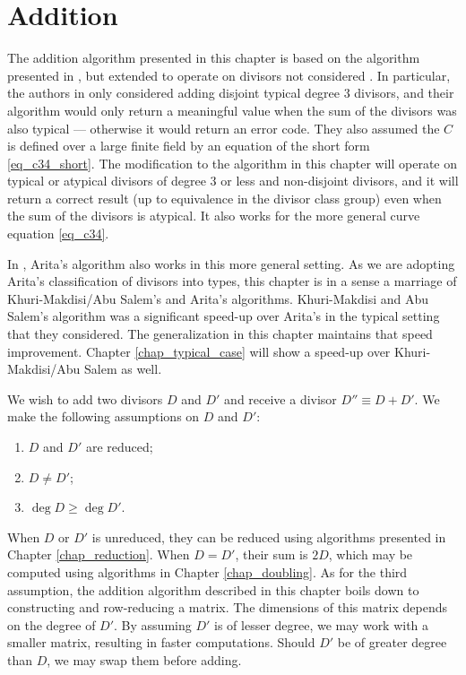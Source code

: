 
\section{Addition}
\label{chap_addition}

The addition algorithm presented in this chapter is based on the algorithm presented in \cite{salem07},
but extended to operate on divisors not considered \cite{salem07}.
In particular, the authors in \cite{salem07} only considered adding disjoint typical degree 3 divisors,
and their algorithm would only return a meaningful value when the sum of the divisors was also typical ---
otherwise it would return an error code.
They also assumed the $C$ is defined over a large finite field by an equation of the short form \ref{eq_c34_short}.
The modification to the algorithm in this chapter will operate on typical or atypical divisors of degree 3 or less
and non-disjoint divisors,
and it will return a correct result (up to equivalence in the divisor class group)
even when the sum of the divisors is atypical.
It also works for the more general curve equation \ref{eq_c34}.

In \cite{arita05-2}, Arita's algorithm also works in this more general setting.
As we are adopting Arita's classification of divisors into types,
this chapter is in a sense a marriage of Khuri-Makdisi/Abu Salem's and Arita's algorithms.
Khuri-Makdisi and Abu Salem's algorithm was a significant speed-up over Arita's in the typical setting that they considered.
The generalization in this chapter maintains that speed improvement.
Chapter \ref{chap_typical_case} will show a speed-up over Khuri-Makdisi/Abu Salem as well.

We wish to add two divisors $D$ and $D'$ and receive a divisor $D'' \equiv D + D'$.
We make the following assumptions on $D$ and $D'$:
\begin{enumerate}[label=(\roman*)]
  \item $D$ and $D'$ are reduced;
  \item $D \neq D'$;
  \item $\deg D \geq \deg D'$.
\end{enumerate}
When $D$ or $D'$ is unreduced, they can be reduced using algorithms presented in Chapter \ref{chap_reduction}.
When $D = D'$, their sum is $2D$, which may be computed using algorithms in Chapter \ref{chap_doubling}.
As for the third assumption,
the addition algorithm described in this chapter boils down to constructing and row-reducing a matrix.
The dimensions of this matrix depends on the degree of $D'$.
By assuming $D'$ is of lesser degree, we may work with a smaller matrix, resulting in faster computations.
Should $D'$ be of greater degree than $D$, we may swap them before adding.

